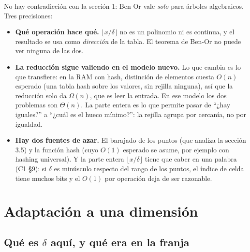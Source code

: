\documentclass[11pt]{article}
\begin{document}
No hay contradicción con la sección 1: Ben-Or vale \emph{solo} para árboles algebraicos. Tres precisiones:

\begin{itemize}[leftmargin=14pt]
\item \textbf{Qué operación hace qué.} $\lfloor x/\delta\rfloor$ no es un polinomio ni es continua, y el
resultado se usa como \emph{dirección} de la tabla. El teorema de Ben-Or no puede ver ninguna de las dos.
\item \textbf{La reducción sigue valiendo en el modelo nuevo.} Lo que cambia es lo que transfiere: en la
RAM con hash, distinción de elementos cuesta $O(n)$ esperado (una tabla hash sobre los valores, sin rejilla
ninguna), así que la reducción solo da $\Omega(n)$, que es leer la entrada. En ese modelo los dos problemas
son $\Theta(n)$. La parte entera es lo que permite pasar de ``¿hay iguales?'' a ``¿cuál es el hueco
mínimo?'': la rejilla agrupa por cercanía, no por igualdad.
\item \textbf{Hay dos fuentes de azar.} El barajado de los puntos (que analiza la sección 3.5) y la
función hash (cuyo $O(1)$ esperado se asume, por ejemplo con hashing universal). Y la parte entera
$\lfloor x/\delta\rfloor$ tiene que caber en una palabra (C1 §9): si $\delta$ es minúsculo respecto del
rango de los puntos, el índice de celda tiene muchos bits y el $O(1)$ por operación deja de ser razonable.
\end{itemize}

\section{Adaptación a una dimensión}

\subsection{Qué es \texorpdfstring{$\delta$}{delta} aquí, y qué era en la franja}
\end{document}
